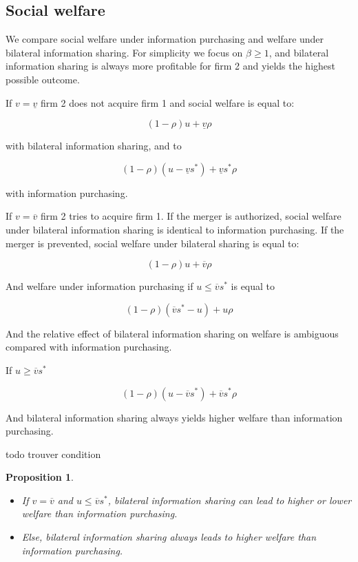 \documentclass[a4paper,leqno]{article}%
\newtheorem{prop}{Proposition}
\newcommand{\uv}{\underline{v}}
\newcommand{\ov}{\overline{v}}
\begin{document}
\medskip

\subsection{Social welfare}

\medskip

We compare social welfare under information purchasing and welfare under bilateral information sharing. For simplicity we focus on $\beta\geq1$, and bilateral information sharing is always more profitable for firm 2 and yields the highest possible outcome.

\medskip

If $v=\uv$ firm 2 does not acquire firm 1 and social welfare is equal to:

\[
(1-\rho) u+\uv \rho
\]

with bilateral information sharing, and to

\[
(1-\rho) (u-\uv s^*)+\uv s^*\rho
\]

with information purchasing.

\medskip

If $v=\ov$ firm 2 tries to acquire firm 1. If the merger is authorized, social welfare under bilateral information sharing is identical to information purchasing. If the merger is prevented, social welfare under bilateral sharing is equal to:

\medskip

\[
(1-\rho) u +\ov \rho
\]

\medskip

And welfare under information purchasing if $u\leq \ov s^*$ is equal to

\medskip

\[
(1-\rho) (\ov s^*-u)+u\rho
\]

\medskip

And the relative effect of bilateral information sharing on welfare is ambiguous compared with information purchasing.

\medskip

If $u\geq \ov s^*$ 

\[
(1-\rho) (u-\ov s^*)+\ov s^*\rho
\]

And bilateral information sharing always yields higher welfare than information purchasing.


\medskip

todo trouver condition
\begin{prop}~~

\begin{itemize}
    \item If $v=\ov$ and $u\leq \ov s^*$, bilateral information sharing can lead to higher or lower welfare than information purchasing. 
    \item Else, bilateral information sharing always leads to higher welfare than information purchasing.
\end{itemize}

\end{prop}
\end{document}
